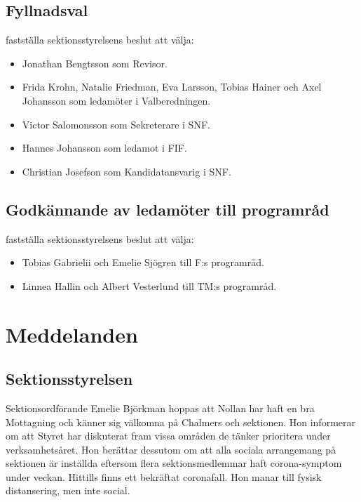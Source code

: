 \documentclass[hidelinks]{../sektionsmote} %
\begin{document}
\subsection{Fyllnadsval}
\begin{beslut}
    \item fastställa sektionsstyrelsens beslut att välja:
    \begin{itemize}
        \item Jonathan Bengtsson som Revisor.
        \item Frida Krohn, Natalie Friedman, Eva Larsson, Tobias Hainer och Axel Johansson som ledamöter i Valberedningen.
        \item Victor Salomonsson som Sekreterare i SNF.
        \item Hannes Johansson som ledamot i FIF.
        \item Christian Josefson som Kandidatansvarig i SNF.
    \end{itemize}
\end{beslut}

\subsection{Godkännande av ledamöter till programråd}
\begin{beslut}
    \item fastställa sektionsstyrelsens beslut att välja:
    \begin{itemize}
        \item Tobias Gabrielii och Emelie Sjögren till F:s programråd.
        \item Linnea Hallin och Albert Vesterlund till TM:s programråd.
    \end{itemize}
\end{beslut}


\section{Meddelanden}

\subsection{Sektionsstyrelsen}
Sektionsordförande Emelie Björkman hoppas att Nollan har haft en bra Mottagning och känner sig välkomna på Chalmers och sektionen.
Hon informerar om att Styret har diskuterat fram vissa områden de tänker prioritera under verksamhetsåret.
Hon berättar dessutom om att alla sociala arrangemang på sektionen är inställda eftersom flera sektionsmedlemmar haft corona-symptom under veckan.
Hittills finns ett bekräftat coronafall.
Hon manar till fysisk distansering, men inte social.
\end{document}
